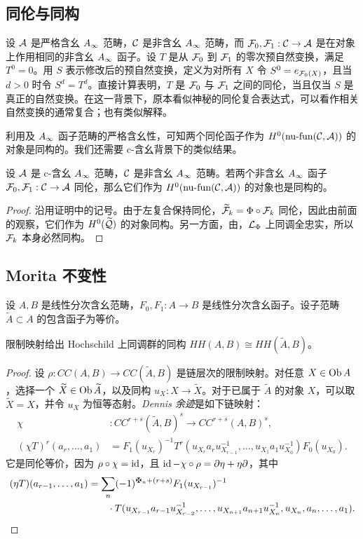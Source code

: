 \subsection{同伦与同构}\label{sec:2c}
设 $\mathcal A$ 是严格含幺 $A_\infty$ 范畴，$\mathcal C$ 是非含幺 $A_\infty$ 范畴，而 $\mathcal F_0,\mathcal F_1:\mathcal C\to\mathcal A$ 是在对象上作用相同的非含幺 $A_\infty$ 函子。设 $T$ 是从 $\mathcal F_0$ 到 $\mathcal F_1$ 的零次预自然变换，满足 $T^0=0$。用 $S$ 表示修改后的预自然变换，定义为对所有 $X$ 令 $S^0=e_{\mathcal F_0(X)}$，且当 $d>0$ 时令 $S^d=T^d$。直接计算表明，$T$ 是 $\mathcal F_0$ 与 $\mathcal F_1$ 之间的同伦，当且仅当 $S$ 是真正的自然变换。在这一背景下，原本看似神秘的同伦复合表达式，可以看作相关自然变换的通常复合；也有类似解释。

利用及 $A_\infty$ 函子范畴的严格含幺性，可知两个同伦函子作为 $H^0(\operatorname{nu\text{-}fun}(\mathcal C,\mathcal A))$ 的对象是同构的。我们还需要 c-含幺背景下的类似结果。

\begin{lemma}\label{st:2.5}
设 $\mathcal A$ 是 c-含幺 $A_\infty$ 范畴，$\mathcal C$ 是非含幺 $A_\infty$ 范畴。若两个非含幺 $A_\infty$ 函子 $\mathcal F_0,\mathcal F_1:\mathcal C\to\mathcal A$ 同伦，那么它们作为 $H^0(\operatorname{nu\text{-}fun}(\mathcal C,\mathcal A))$ 的对象也是同构的。
\end{lemma}
\begin{proof}
沿用证明中的记号。由于左复合保持同伦，$\widetilde{\mathcal F}_k=\Phi\circ\mathcal F_k$ 同伦，因此由前面的观察，它们作为 $H^0(\widetilde{\mathcal Q})$ 的对象同构。另一方面，由，$\mathcal L_{\Phi}$ 上同调全忠实，所以 $\mathcal F_k$ 本身必然同构。
\end{proof}

\subsection{Morita 不变性}\label{sec:2d}
设 $A,B$ 是线性分次含幺范畴，$F_0,F_1:A\to B$ 是线性分次含幺函子。设子范畴 $\widetilde A\subset A$ 的包含函子为等价。

\begin{lemma}\label{st:2.6}
限制映射给出 Hochschild 上同调群的同构 $HH(A,B)\cong HH(\widetilde A,B)$。
\end{lemma}
\begin{proof}
设 $\rho:CC(A,B)\to CC(\widetilde A,B)$ 是链层次的限制映射。对任意 $X\in\operatorname{Ob} A$，选择一个 $\widetilde X\in\operatorname{Ob}\widetilde A$，以及同构 $u_X:X\to\widetilde X$。对于已属于 $\widetilde A$ 的对象 $X$，可以取 $\widetilde X=X$，并令 $u_X$ 为恒等态射。\emph{Dennis 余迹}是如下链映射：
\[
\begin{aligned}
\chi &:CC^{r+s}(\widetilde A,B)^s\longrightarrow CC^{r+s}(A,B)^s,\\
(\chi T)^r(a_r,\ldots,a_1)
&=F_1(u_{X_r})^{-1}T^r(u_{X_r}a_ru_{X_{r-1}}^{-1},\ldots,u_{X_1}a_1u_{X_0}^{-1})F_0(u_{X_0}).
\end{aligned}
\]
它是同伦等价，因为 $\rho\circ\chi=\operatorname{id}$，且 $\operatorname{id}-\chi\circ\rho=\partial\eta+\eta\partial$，其中
\[
\begin{aligned}
(\eta T)(a_{r-1},\ldots,a_1)
&=\sum_n(-1)^{\sgnmark_n+(r+s)}F_1(u_{X_{r-1}})^{-1}\\
&\qquad\cdot T(u_{X_{r-1}}a_{r-1}u_{X_{r-2}}^{-1},\ldots,u_{X_{n+1}}a_{n+1}u_{X_n}^{-1},u_{X_n},a_n,\ldots,a_1).
\end{aligned}
\]
\end{proof}

